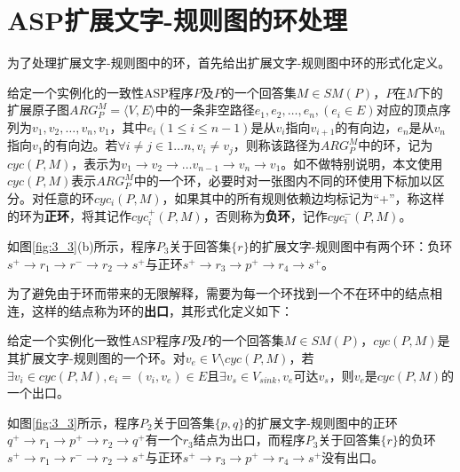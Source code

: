 \section{ASP扩展文字-规则图的环处理}
为了处理扩展文字-规则图中的环，首先给出扩展文字-规则图中环的形式化定义。
\begin{definition}
    给定一个实例化的一致性ASP程序$P$及$P$的一个回答集$M \in SM(P)$，$P$在$M$下的扩展原子图$ARG_P^M= \langle V, E \rangle$中的一条非空路径$e_1, e_2, \ldots, e_n, (e_i \in E)$对应的顶点序列为$v_1, v_2, \ldots, v_n, v_1$，其中$e_i (1 \le i \le n-1)$是从$v_i$指向$v_{i+1}$的有向边，$e_n$是从$v_n$指向$v_1$的有向边。若$\forall i \neq j \in 1 \ldots n, v_i \neq v_j$，则称该路径为$ARG_P^M$中的环，记为$cyc(P,M)$，表示为$v_1 \rightarrow v_2 \rightarrow \ldots v_{n-1} \rightarrow v_n \rightarrow v_1$。如不做特别说明，本文使用$cyc(P,M)$表示$ARG_P^M$中的一个环，必要时对一张图内不同的环使用下标加以区分。对任意的环$cyc_i(P,M)$，如果其中的所有规则依赖边均标记为“+”，称这样的环为\textbf{正环}，将其记作$cyc_i^+(P,M)$，否则称为\textbf{负环}，记作$cyc_i^-(P,M)$。
\end{definition}

\begin{example}
    如图\ref{fig:3_3}(b)所示，程序\hyperref[prg:p3]{$P_3$}关于回答集$\{r\}$的扩展文字-规则图中有两个环：负环$s^+ \rightarrow r_1 \rightarrow r^- \rightarrow r_2 \rightarrow s^+$与正环$s^+ \rightarrow r_3 \rightarrow p^+ \rightarrow r_4 \rightarrow s^+$。
\end{example}

为了避免由于环而带来的无限解释，需要为每一个环找到一个不在环中的结点相连，这样的结点称为环的\textbf{出口}，其形式化定义如下：

\begin{definition}
    给定一个实例化一致性ASP程序$P$及$P$的一个回答集$M \in SM(P)$，$cyc(P, M)$是其扩展文字-规则图的一个环。对$v_e \in V \setminus cyc(P, M)$，若$\exists v_i \in cyc(P,M), e_i=(v_i, v_e) \in E$且$\exists v_s \in V_{sink}, v_e$可达$v_s$，则$v_e$是$cyc(P, M)$的一个出口。
\end{definition}

\begin{example}
    如图\ref{fig:3_3}所示，程序\hyperref[prg:p2]{$P_2$}关于回答集$\{p, q\}$的扩展文字-规则图中的正环$q^+ \rightarrow r_1 \rightarrow p^+ \rightarrow r_2 \rightarrow q^+$有一个$r_3$结点为出口，而程序\hyperref[prg:p3]{$P_3$}关于回答集$\{r\}$的负环$s^+ \rightarrow r_1 \rightarrow r^- \rightarrow r_2 \rightarrow s^+$与正环$s^+ \rightarrow r_3 \rightarrow p^+ \rightarrow r_4 \rightarrow s^+$没有出口。
\end{example}


